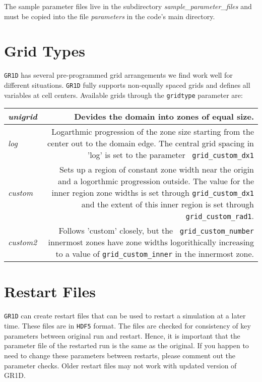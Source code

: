 \documentclass[10pt,nofootinbib]{article}
\newcommand{\code}[1]{\texttt{#1}}
\begin{document}
The sample parameter files live in the subdirectory 
\emph{sample\_parameter\_files} and must be copied into the
file \emph{parameters} in the code's main directory. 

\section{Grid Types}
\label{sec:gridtypes}
\code{GR1D} has several pre-programmed grid arrangements we find work
well for different situations.  \code{GR1D} fully supports non-equally
spaced grids and defines all variables at cell centers.  Available
grids through the {\tt gridtype} parameter are:

\begin{tabular}{lr}
\emph{unigrid}&\parbox[t]{13cm}{Devides the domain into zones of equal
  size.}\\ 
\hline
\emph{log}&\parbox[t]{13cm}{Logarthmic progression of the zone size
  starting from the center out to the domain edge.  The central grid
  spacing in 'log' is set to the parameter {\tt
    grid\_custom\_dx1}}\\ 

\hline

\emph{custom}&\parbox[t]{13cm}{Sets up a region of constant zone width
  near the origin and a logorthmic progression outside.  The value for
  the inner region zone widths is set through {\tt grid\_custom\_dx1}
  and the extent of this inner region is set through {\tt
    grid\_custom\_rad1}.}\\

\hline

\emph{custom2}&\parbox[t]{13cm}{Follows 'custom' closely, but the {\tt
    grid\_custom\_number} innermost zones have zone widths
  logorithically increasing to a value of {\tt grid\_custom\_inner} in
  the innermost zone.  }\\

\end{tabular}

\section{Restart Files}
\code{GR1D} can create restart files that can be used to restart a
simulation at a later time.  These files are in \code{HDF5} format.
The files are checked for consistency of key parameters between
original run and restart. Hence, it is important that the parameter
file of the restarted run is the same as the original. If you happen
to need to change these parameters between restarts, please comment
out the parameter checks.  Older restart files may not work with
updated version of GR1D.
\end{document}
